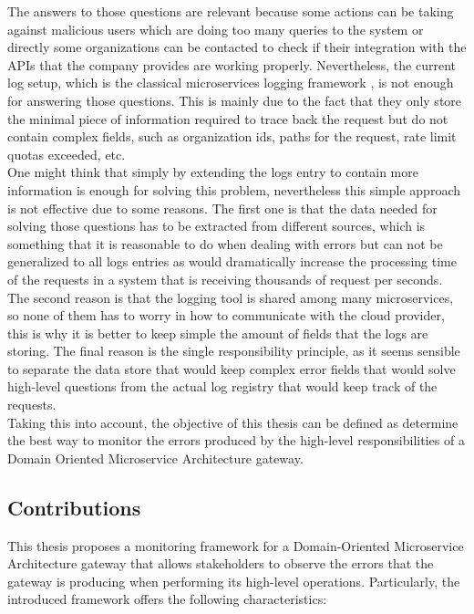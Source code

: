 \documentclass[english, 12pt, a4paper, sci, utf8, a-1b, online]{aaltothesis}
\begin{document}
The answers to those questions are relevant because some actions can be taking against malicious users which are doing too many queries to the system or directly some organizations can be contacted to check if their integration with the APIs that the company provides are working properly. Nevertheless, the current log setup, which is the classical microservices logging framework \cite{MicroservicesBestPractices}, is not enough for answering those questions. This is mainly due to the fact that they only store the minimal piece of information required to trace back the request but do not contain complex fields, such as organization ids, paths for the request, rate limit quotas exceeded, etc.\\

One might think that simply by extending the logs entry to contain more information is enough for solving this problem, nevertheless this simple approach is not effective due to some reasons. The first one is that the data needed for solving those questions has to be extracted from different sources, which is something that it is reasonable to do when dealing with errors but can not be generalized to all logs entries as would dramatically increase the processing time of the requests in a system that is receiving thousands of request per seconds. The second reason is that the logging tool is shared among many microservices, so none of them has to worry in how to communicate with the cloud provider, this is why it is better to keep simple the amount of fields that the logs are storing. The final reason is the single responsibility principle, as it seems sensible to separate the data store that would keep complex error fields that would solve high-level questions from the actual log registry that would keep track of the requests.\\

Taking this into account, the objective of this thesis can be defined as determine the best way to monitor the errors produced by the high-level responsibilities of a Domain Oriented Microservice Architecture gateway.

\subsection{Contributions}


This thesis proposes a monitoring framework for a Domain-Oriented Microservice Architecture gateway that allows stakeholders to observe the errors that the gateway is producing when performing its high-level operations. Particularly, the introduced framework offers the following characteristics:
\end{document}
